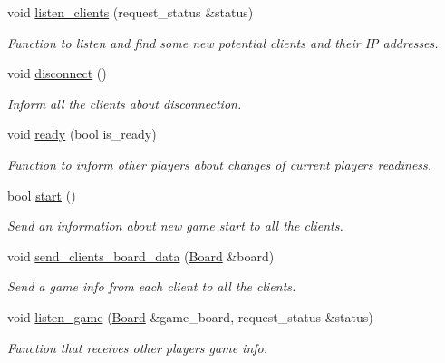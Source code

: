 \begin{DoxyCompactItemize}
void \hyperlink{classServer_a4d1e997c505b0e0eae2d579eae4b5d1c}{listen\+\_\+clients} (request\+\_\+status \&status)
\begin{DoxyCompactList}\small\item\em Function to listen and find some new potential clients and their IP addresses. \end{DoxyCompactList}\item 
\mbox{\label{classServer_acd0114484495cfd2749816ddb12e4246}} 
void \hyperlink{classServer_acd0114484495cfd2749816ddb12e4246}{disconnect} ()
\begin{DoxyCompactList}\small\item\em Inform all the clients about disconnection. \end{DoxyCompactList}\item 
\mbox{\label{classServer_a5a68e06093d80b66c745f1a226e17ce7}} 
void \hyperlink{classServer_a5a68e06093d80b66c745f1a226e17ce7}{ready} (bool is\+\_\+ready)
\begin{DoxyCompactList}\small\item\em Function to inform other players about changes of current player\textquotesingle{}s readiness. \end{DoxyCompactList}\item 
bool \hyperlink{classServer_acec935535d1d5b58d95cf24678eac014}{start} ()
\begin{DoxyCompactList}\small\item\em Send an information about new game start to all the clients. \end{DoxyCompactList}\item 
void \hyperlink{classServer_a3515fb61ca9272c111bd62f4f78e792a}{send\+\_\+clients\+\_\+board\+\_\+data} (\hyperlink{classBoard}{Board} \&board)
\begin{DoxyCompactList}\small\item\em Send a game info from each client to all the clients. \end{DoxyCompactList}\item 
void \hyperlink{classServer_aff65d0adf4570f2b1ffca2d961191901}{listen\+\_\+game} (\hyperlink{classBoard}{Board} \&game\+\_\+board, request\+\_\+status \&status)
\begin{DoxyCompactList}\small\item\em Function that receives other players\textquotesingle{} game info. \end{DoxyCompactList}\item 

\end{DoxyCompactItemize}
